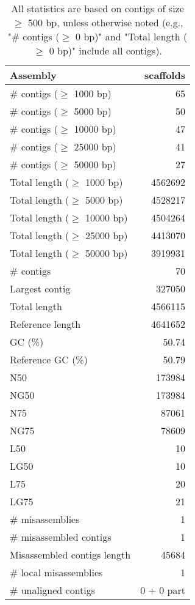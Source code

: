 \documentclass[12pt,a4paper]{article}
\begin{document}
\begin{table}[ht]
\begin{center}
\caption{All statistics are based on contigs of size $\geq$ 500 bp, unless otherwise noted (e.g., "\# contigs ($\geq$ 0 bp)" and "Total length ($\geq$ 0 bp)" include all contigs).}
\begin{tabular}{|l*{1}{|r}|}
\hline
Assembly & scaffolds \\ \hline
\# contigs ($\geq$ 1000 bp) & 65 \\ \hline
\# contigs ($\geq$ 5000 bp) & 50 \\ \hline
\# contigs ($\geq$ 10000 bp) & 47 \\ \hline
\# contigs ($\geq$ 25000 bp) & 41 \\ \hline
\# contigs ($\geq$ 50000 bp) & 27 \\ \hline
Total length ($\geq$ 1000 bp) & 4562692 \\ \hline
Total length ($\geq$ 5000 bp) & 4528217 \\ \hline
Total length ($\geq$ 10000 bp) & 4504264 \\ \hline
Total length ($\geq$ 25000 bp) & 4413070 \\ \hline
Total length ($\geq$ 50000 bp) & 3919931 \\ \hline
\# contigs & 70 \\ \hline
Largest contig & 327050 \\ \hline
Total length & 4566115 \\ \hline
Reference length & 4641652 \\ \hline
GC (\%) & 50.74 \\ \hline
Reference GC (\%) & 50.79 \\ \hline
N50 & 173984 \\ \hline
NG50 & 173984 \\ \hline
N75 & 87061 \\ \hline
NG75 & 78609 \\ \hline
L50 & 10 \\ \hline
LG50 & 10 \\ \hline
L75 & 20 \\ \hline
LG75 & 21 \\ \hline
\# misassemblies & 1 \\ \hline
\# misassembled contigs & 1 \\ \hline
Misassembled contigs length & 45684 \\ \hline
\# local misassemblies & 1 \\ \hline
\# unaligned contigs & 0 + 0 part \\ \hline

\end{tabular}
\end{center}
\end{table}
\end{document}
